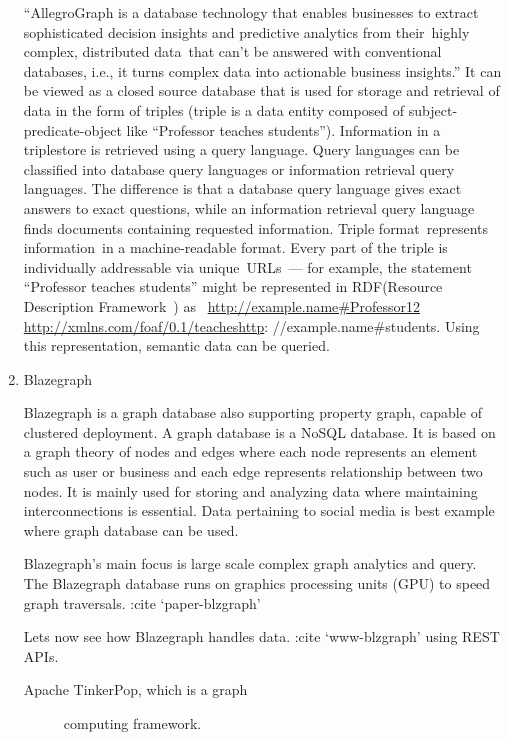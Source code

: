 \begin{enumerate}
“AllegroGraph is a database technology that enables businesses to
extract sophisticated decision insights and predictive analytics
from their highly complex, distributed data that can’t be
answered with conventional databases, i.e., it turns complex data
into actionable business insights.” \label{\detokenize{i524/technologies:id459}}{\hyperref[\detokenize{i524/technologies:www-allegro}]{\sphinxcrossref{{[}393{]}}}} It can be
viewed as a closed source database that is used for storage and
retrieval of data in the form of triples (triple is a data entity
composed of subject-predicate-object like “Professor teaches
students”).  Information in a triplestore is retrieved using a
query language. Query languages can be classified into database
query languages or information retrieval query languages. The
difference is that a database query language gives exact answers
to exact questions, while an information retrieval query language
finds documents containing requested information.  Triple
format represents information in a machine-readable format.
Every part of the triple is individually addressable via
unique URLs — for example, the statement “Professor teaches
students” might be represented in RDF(Resource Description
Framework ) as  \url{http://example.name\#Professor12}
\url{http://xmlns.com/foaf/0.1/teacheshttp}:
//example.name\#students. Using this representation, semantic data
can be queried.  \label{\detokenize{i524/technologies:id460}}{\hyperref[\detokenize{i524/technologies:www-allegrow}]{\sphinxcrossref{{[}394{]}}}}

\item {} 
Blazegraph

Blazegraph is a graph database also supporting property graph,
capable of clustered deployment. A graph database is a NoSQL
database. It is based on a graph theory of nodes and edges where
each node represents an element such as user or business and each
edge represents relationship between two nodes. It is mainly used
for storing and analyzing data where maintaining interconnections
is essential. Data pertaining to social media is best example where
graph database can be used.

Blazegraph’s main focus is large scale complex graph analytics and query.
The Blazegraph database runs on graphics processing units (GPU) to
speed graph traversals. :cite ‘paper-blzgraph’

Lets now see how Blazegraph handles data. :cite ‘www-blzgraph’
 using REST APIs.
\begin{description}
\item[{ Apache TinkerPop, which is a graph}] \leavevmode
computing framework.


\end{description}
\end{enumerate}
